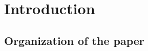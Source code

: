 
\section{Introduction}	\label{sec:intro}


\subsection{Organization of the paper}	\label{subsubsec:organzation}